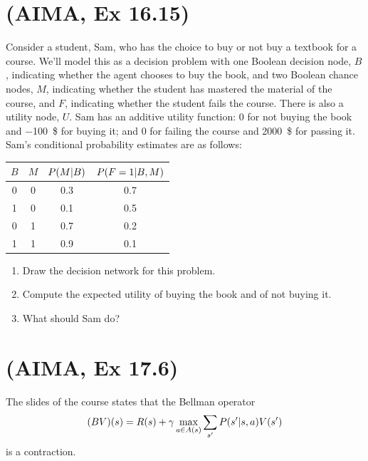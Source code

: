 \documentclass[11pt, a4paper]{article}
\begin{document}
\newpage

\section{(AIMA, Ex 16.15)}

Consider a student, Sam, who has the choice to buy or not buy a textbook for a course. We'll model this as a decision problem with one Boolean decision node, $B$, indicating whether the agent chooses to buy the book, and two Boolean chance nodes,
$M$, indicating whether the student has mastered the material of the course, and $F$, indicating whether the student fails the course. There is also a utility node, $U$. Sam has an additive utility function: 0 for not buying the book and \SI{-100}{\$} for buying it; and 0 for failing the course and \SI{2000}{\$} for passing it. Sam's conditional probability estimates are as follows:

\begin{table}[h]
    \centering
    \begin{tabular}{cc|cc}
        \toprule
        $B$ & $M$ & $P(M \vert B)$ & $P(F = 1 \vert B, M)$ \\
        \midrule
        0 & 0 & 0.3 & 0.7 \\
        1 & 0 & 0.1 & 0.5 \\
        0 & 1 & 0.7 & 0.2 \\
        1 & 1 & 0.9 & 0.1 \\
        \bottomrule
    \end{tabular}
\end{table}

\begin{enumerate}
    \item Draw the decision network for this problem.
    
    \item Compute the expected utility of buying the book and of not buying it.
    
    \item What should Sam do?
\end{enumerate}

\newpage

\section{(AIMA, Ex 17.6)}

The slides of the course states that the Bellman operator 
\begin{equation*}
    (B V)(s) = R(s) + \gamma \max_{a \in A(s)} \sum_{s'} P(s' \vert s, a) V(s')
\end{equation*}
is a contraction.
\end{document}
